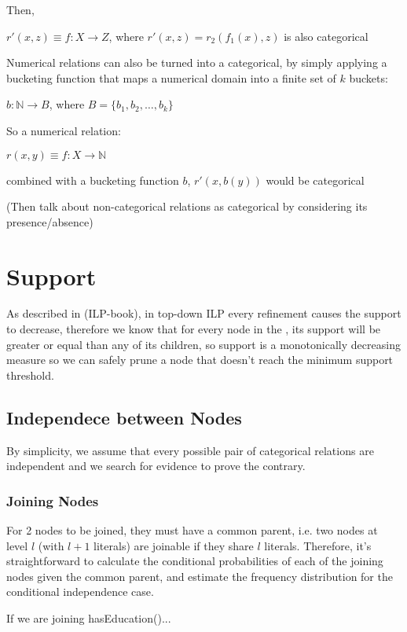Then,

$r'(x,z) \equiv f : X \rightarrow Z$, where $r'(x,z)=r_2(f_1(x),z)$ is also categorical


Numerical relations can also be turned into a categorical, by simply applying a bucketing function that maps a numerical domain into a finite set of $k$ buckets:

$b: \mathbb{N} \rightarrow B$, where $B=\{b_1,b_2,\dots ,b_k \}$

So a numerical relation:

$r(x,y) \equiv f : X \rightarrow \mathbb{N}$ 

combined with a bucketing function $b$, $r'(x,b(y))$ would be categorical

(Then talk about non-categorical relations as categorical by considering its presence/absence)

\section{Support}

As described in (ILP-book), in top-down ILP every refinement causes the support to decrease, therefore we know that for every node in the \graphname, its support will be greater or equal than any of its children, so support is a monotonically decreasing measure so we can safely prune a node that doesn't reach the minimum support threshold.


\subsection{Independece between Nodes}

By simplicity, we assume that every possible pair of categorical relations are independent and we search for evidence to prove the contrary.

\subsubsection{Joining Nodes}

For 2 nodes to be joined, they must have a common parent, i.e. two nodes at level $l$ (with $l+1$ literals) are joinable if they share $l$ literals. Therefore, it's straightforward to calculate the conditional probabilities of each of the joining nodes given the common parent, and estimate the frequency distribution for the conditional independence case.

If we are joining hasEducation()...

